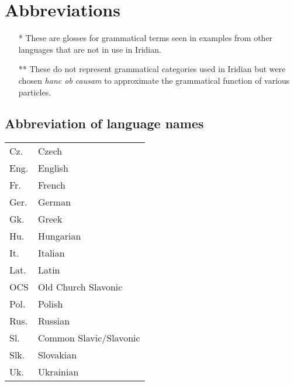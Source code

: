 
\chapter*{Abbreviations}
\printglossary[style=myglosses,type=\leipzigtype, title={Glossing abbreviations}]

\smallskip

{\small
\begin{itemize}
\item[*] These are glosses for grammatical terms seen in examples from other languages that are not in use in Iridian.
\item[**] These do not represent grammatical categories used in Iridian but were chosen \emph{hanc ob causam} to approximate the grammatical function of various particles.
\end{itemize}}

\bigskip
\printglossary[style=langlist,type=\acronymtype, title={Abbreviation of language names}]

\clearpage

\section*{Abbreviation of language names}

\begin{longtabu} {YY[2.5]}
	Cz.		& Czech\\
	Eng.	& English\\
	Fr.		& French\\
	Ger.	& German\\
	Gk.		& Greek\\
	Hu.		& Hungarian\\
	It.		& Italian\\
	Lat.	& Latin\\
	OCS		& Old Church Slavonic\\
	Pol.	& Polish\\
	Rus.	& Russian\\
	Sl.		& Common Slavic/Slavonic\\
	Slk.	& Slovakian\\
	Uk.		& Ukrainian\\
\end{longtabu}


